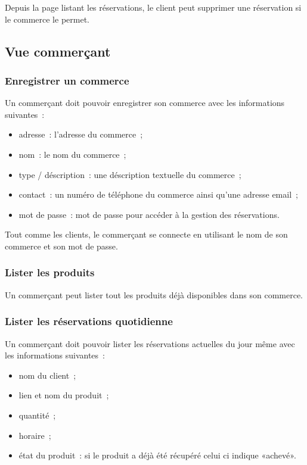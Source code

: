 \documentclass[a4paper,12pt]{article}
\begin{document}
Depuis la page listant les réservations, le client peut supprimer une réservation si le commerce le permet.

\subsection{Vue commerçant}

\subsubsection{Enregistrer un commerce}

Un commerçant doit pouvoir enregistrer son commerce avec les informations suivantes~:

\begin{itemize}
	\item adresse~: l'adresse du commerce~;
	\item nom~: le nom du commerce~;
	\item type / déscription~: une déscription textuelle du commerce~;
	\item contact~: un numéro de téléphone du commerce ainsi qu'une adresse email~;
	\item mot de passe~: mot de passe pour accéder à la gestion des réservations.
\end{itemize}

Tout comme les clients, le commerçant se connecte en utilisant le nom de son commerce et son mot de passe.

\subsubsection{Lister les produits}

Un commerçant peut lister tout les produits déjà disponibles dans son commerce.

\subsubsection{Lister les réservations quotidienne}

Un commerçant doit pouvoir lister les réservations actuelles du jour même avec les informations suivantes~:

\begin{itemize}
	\item nom du client~;
	\item lien et nom du produit~;
	\item quantité~;
	\item horaire~;
	\item état du produit~: si le produit a déjà été récupéré celui ci indique «achevé».
\end{itemize}
\end{document}
